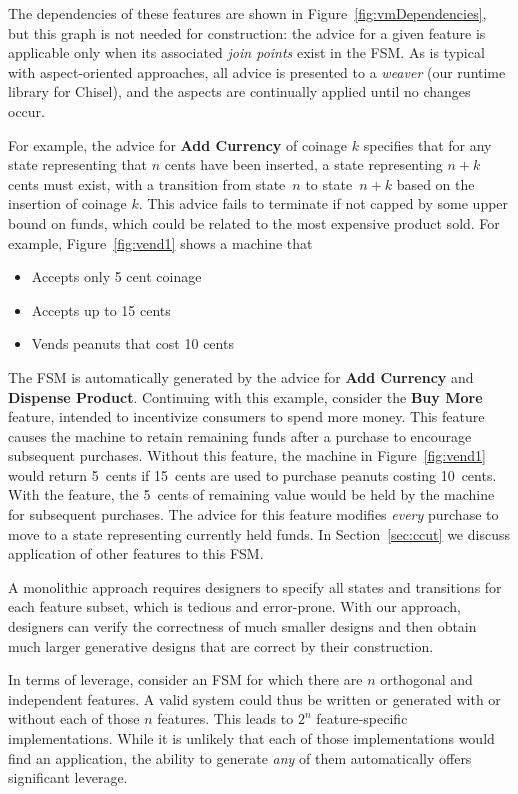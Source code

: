 \documentclass[conference]{IEEEtran}
\begin{document}
The dependencies of these features are shown in Figure~\ref{fig:vmDependencies}, but this graph is not needed for construction:  the advice for a given feature is applicable only when its associated \emph{join points} exist in the FSM.  As is typical with aspect-oriented approaches, all advice is presented to a \emph{weaver} (our runtime library for Chisel), and the aspects are continually applied until no changes occur.

For example, the advice for \textbf{Add Currency} of coinage $k$ specifies that for any state representing that $n$ cents have been inserted, a state representing $n+k$ cents must exist, with a transition from state~$n$ to state~$n+k$ based on the insertion of coinage $k$.   This advice fails to terminate if not capped by some upper bound on funds, which could be related to the most expensive product sold. For example, Figure~\ref{fig:vend1} shows a machine that
\begin{itemize}
    \item Accepts only 5 cent coinage
    \item Accepts up to 15 cents
    \item Vends peanuts that cost 10 cents
\end{itemize}
The FSM is automatically generated by the advice for \textbf{Add Currency} and \textbf{Dispense Product}.  Continuing with this example, consider the \textbf{Buy More} feature, intended to incentivize consumers to spend more money.  This feature causes the machine to retain remaining funds after a purchase to encourage subsequent purchases.  Without this feature, the machine in Figure~\ref{fig:vend1} would return 5~cents if 15~cents are used to purchase peanuts costing 10~cents.  With the feature, the 5~cents of remaining value would be held by the machine for subsequent purchases.  The advice for this feature modifies \emph{every} purchase to move to a state representing currently held funds.  In Section~\ref{sec:ccut} we discuss application of other features to this FSM.

A monolithic approach requires designers to specify all states and transitions for each feature subset, which is tedious and error-prone. With our approach, designers can verify the correctness of much smaller designs and then obtain much larger generative designs that are correct by their construction.

In terms of leverage, consider an FSM for which there are $n$ orthogonal and independent features.  A valid system could thus be written or generated with or without each of those $n$ features.  This leads to $2^{n}$ feature-specific implementations.  While it is unlikely that each of those implementations would find an application, the ability to generate \emph{any} of them automatically offers significant leverage.
\end{document}
